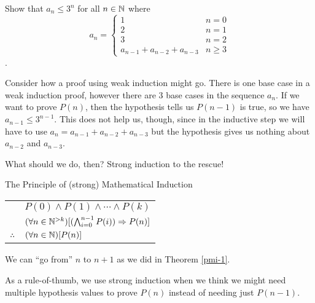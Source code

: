 \documentclass[main.tex]{subfiles}
\begin{document}
\begin{example}
	\label{first-strong-proof}
	Show that \(a_n \leq 3^n\) for all \(n \in \mathbb{N}\) where \[a_n = \begin{cases} 1 & n=0 \\ 2 & n=1 \\ 3 & n=2 \\ a_{n-1} + a_{n-2} + a_{n-3} & n \geq 3 \end{cases}\].
	
	Consider how a proof using weak induction might go. There is one base case in a weak induction proof, however there are 3 base cases in the sequence \(a_n\). If we want to prove \(P(n)\), then the hypothesis tells us \(P(n-1)\) is true, so we have \(a_{n-1} \leq 3^{n-1}\). This does not help us, though, since in the inductive step we will have to use \(a_n = a_{n-1} + a_{n-2} + a_{n-3}\) but the hypothesis gives us nothing about \(a_{n-2}\) and \(a_{n-3}\).
	
	What should we do, then? Strong induction to the rescue!
\end{example}

\begin{thm}{The Principle of (strong) Mathematical Induction \label{psi}}
	\begin{center}
		\begin{tabular}{rl}
			& \(P(0) \land P(1) \land \cdots \land P(k)\) \\
			& \((\forall n \in \mathbb{N}^{> k})[(\bigwedge_{i=0}^{n-1} P(i)) \Rightarrow P(n)]\) \\
			\midrule
			\(\therefore\) & \((\forall n \in \mathbb{N})[P(n)]\) \\
		\end{tabular}
	\end{center}
\end{thm}

\begin{rem}
	We can ``go from'' \(n\) to \(n+1\) as we did in Theorem \ref{pmi-1}.
\end{rem}

As a rule-of-thumb, we use strong induction when we think we might need multiple hypothesis values to prove \(P(n)\) instead of needing just \(P(n-1)\).
\end{document}
